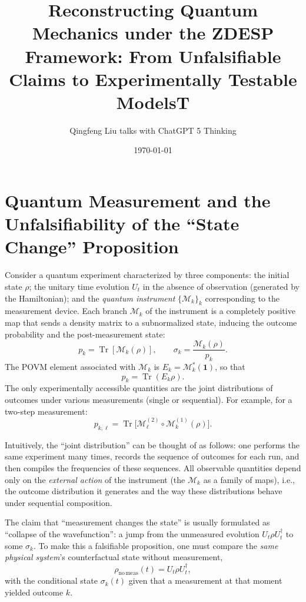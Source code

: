 \documentclass[12pt,a4paper]{article}
\begin{document}
	
	\title{Reconstructing Quantum Mechanics under the ZDESP Framework: From Unfalsifiable Claims to Experimentally Testable ModelsT\textsuperscript{\scriptsize\textcopyright}}
	\author{Qingfeng Liu talks with ChatGPT\textsuperscript{\scriptsize\textregistered} 5 Thinking}

	\date{\today}
	\maketitle
	
	\section{Quantum Measurement and the Unfalsifiability of the ``State Change'' Proposition}
	
	Consider a quantum experiment characterized by three components: the initial state $\rho$; the unitary time evolution $U_t$ in the absence of observation (generated by the Hamiltonian); and the \emph{quantum instrument} $\{\mathcal M_k\}_k$ corresponding to the measurement device. Each branch $\mathcal M_k$ of the instrument is a completely positive map that sends a density matrix to a subnormalized state, inducing the outcome probability and the post-measurement state:
	\[
	p_k = \operatorname{Tr}[\mathcal M_k(\rho)], \qquad
	\sigma_k = \frac{\mathcal M_k(\rho)}{p_k}.
	\]
	The POVM element associated with $\mathcal M_k$ is $E_k = \mathcal M_k^{\ast}(\mathbf 1)$, so that
	\[
	p_k = \operatorname{Tr}(E_k \rho).
	\]
	The only experimentally accessible quantities are the joint distributions of outcomes under various measurements (single or sequential). For example, for a two-step measurement:
	\[
	p_{k,\ell} = \operatorname{Tr}\!\big[ \mathcal M_\ell^{(2)} \circ \mathcal M_k^{(1)} (\rho) \big].
	\]
	
	Intuitively, the ``joint distribution'' can be thought of as follows: one performs the same experiment many times, records the sequence of outcomes for each run, and then compiles the frequencies of these sequences. All observable quantities depend only on the \emph{external action} of the instrument (the $\mathcal M_k$ as a family of maps), i.e., the outcome distribution it generates and the way these distributions behave under sequential composition.
	
	The claim that ``measurement changes the state'' is usually formulated as ``collapse of the wavefunction'': a jump from the unmeasured evolution $U_t \rho U_t^\dagger$ to some $\sigma_k$. To make this a falsifiable proposition, one must compare the \emph{same physical system}'s counterfactual state without measurement,
	\[
	\rho_{\mathrm{no\,meas}}(t) = U_t \rho U_t^\dagger,
	\]
	with the conditional state $\sigma_k(t)$ given that a measurement at that moment yielded outcome $k$.
	
\end{document}

